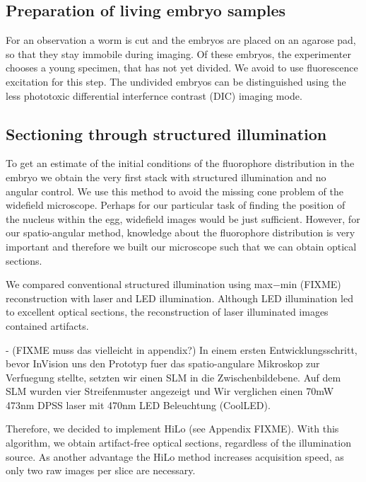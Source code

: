 \subsection{Preparation of living embryo samples}
For an observation a worm is cut and the embryos are placed on an
agarose pad, so that they stay immobile during imaging. Of these
embryos, the experimenter chooses a young specimen, that has not yet
divided. We avoid to use fluorescence excitation for this step.
The undivided embryos can be distinguished using
the less phototoxic differential interfernce contrast (DIC) imaging
mode.

\subsection{Sectioning through structured illumination}
To get an estimate of the initial conditions of the fluorophore
distribution in the embryo we obtain the very first stack with
structured illumination and no angular control. We use this
method to avoid the missing cone problem of the
widefield microscope. Perhaps for our particular task of finding
the position of the nucleus within the egg, widefield images would be
just sufficient.  However, for our spatio-angular method, knowledge
about the fluorophore distribution is very important and therefore we
built our microscope such that we can obtain optical sections.

We compared conventional structured illumination using max$-$min
(FIXME) reconstruction with laser and LED illumination. Although LED
illumination led to excellent optical sections, the reconstruction of
laser illuminated images contained artifacts.

{\color{red}
- (FIXME muss das vielleicht in appendix?) In einem ersten
Entwicklungsschritt, bevor InVision uns den Prototyp fuer das
spatio-angulare Mikroskop zur Verfuegung stellte, setzten wir einen
SLM in die Zwischenbildebene. Auf dem SLM wurden vier Streifenmuster
angezeigt und Wir verglichen einen 70mW 473nm DPSS laser mit 470nm LED
Beleuchtung (CoolLED).}

Therefore, we decided to implement HiLo (see Appendix FIXME). With
this algorithm, we obtain artifact-free optical sections, regardless
of the illumination source. As another advantage the HiLo method
increases acquisition speed, as only two raw images per slice are
necessary.


